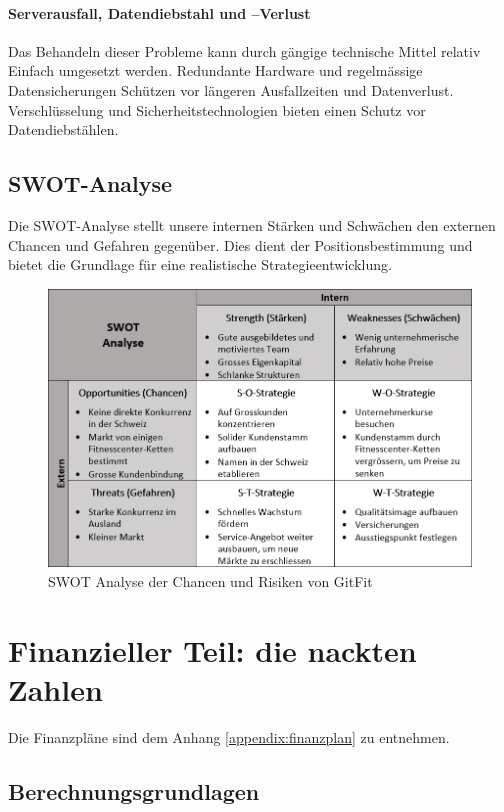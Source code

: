 \paragraph{Serverausfall, Datendiebstahl und –Verlust}
Das Behandeln dieser Probleme kann durch gängige technische Mittel relativ Einfach umgesetzt werden. Redundante Hardware und regelmässige Datensicherungen Schützen vor längeren Ausfallzeiten und Datenverlust. Verschlüsselung und Sicherheitstechnologien bieten einen Schutz vor Datendiebstählen.

\subsection{SWOT-Analyse}

Die SWOT-Analyse stellt unsere internen Stärken und Schwächen den externen Chancen und Gefahren gegenüber. Dies dient der Positionsbestimmung und bietet die Grundlage für eine realistische Strategieentwicklung.

\begin{figure}[H]
	\centering
	\includegraphics[width=1\linewidth]{images/SWOT-analyse}
	\caption{SWOT Analyse der Chancen und Risiken von GitFit}
	\label{fig:swot-analyse}
\end{figure}

\clearpage
\section{Finanzieller Teil: die nackten Zahlen}

Die Finanzpläne sind dem Anhang \ref{appendix:finanzplan} zu entnehmen.

\subsection{Berechnungsgrundlagen}

